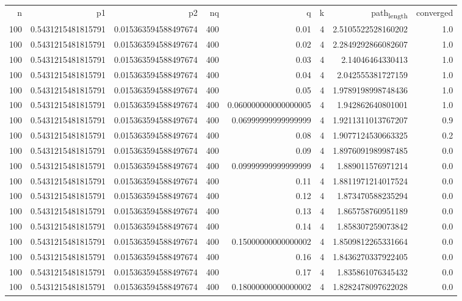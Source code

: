 \documentclass[11pt]{article}
\begin{document}
\begin{center}
\begin{tabular}{rrrrrrrr}
n & p1 & p2 & nq & q & k & path\textsubscript{length} & converged\\
100 & 0.5431215481815791 & 0.015363594588497674 & 400 & 0.01 & 4 & 2.5105522528160202 & 1.0\\
100 & 0.5431215481815791 & 0.015363594588497674 & 400 & 0.02 & 4 & 2.2849292866082607 & 1.0\\
100 & 0.5431215481815791 & 0.015363594588497674 & 400 & 0.03 & 4 & 2.14046464330413 & 1.0\\
100 & 0.5431215481815791 & 0.015363594588497674 & 400 & 0.04 & 4 & 2.042555381727159 & 1.0\\
100 & 0.5431215481815791 & 0.015363594588497674 & 400 & 0.05 & 4 & 1.9789198998748436 & 1.0\\
100 & 0.5431215481815791 & 0.015363594588497674 & 400 & 0.060000000000000005 & 4 & 1.942862640801001 & 1.0\\
100 & 0.5431215481815791 & 0.015363594588497674 & 400 & 0.06999999999999999 & 4 & 1.9211311013767207 & 0.9\\
100 & 0.5431215481815791 & 0.015363594588497674 & 400 & 0.08 & 4 & 1.9077124530663325 & 0.2\\
100 & 0.5431215481815791 & 0.015363594588497674 & 400 & 0.09 & 4 & 1.8976091989987485 & 0.0\\
100 & 0.5431215481815791 & 0.015363594588497674 & 400 & 0.09999999999999999 & 4 & 1.889011576971214 & 0.0\\
100 & 0.5431215481815791 & 0.015363594588497674 & 400 & 0.11 & 4 & 1.8811971214017524 & 0.0\\
100 & 0.5431215481815791 & 0.015363594588497674 & 400 & 0.12 & 4 & 1.873470588235294 & 0.0\\
100 & 0.5431215481815791 & 0.015363594588497674 & 400 & 0.13 & 4 & 1.865758760951189 & 0.0\\
100 & 0.5431215481815791 & 0.015363594588497674 & 400 & 0.14 & 4 & 1.858307259073842 & 0.0\\
100 & 0.5431215481815791 & 0.015363594588497674 & 400 & 0.15000000000000002 & 4 & 1.8509812265331664 & 0.0\\
100 & 0.5431215481815791 & 0.015363594588497674 & 400 & 0.16 & 4 & 1.8436270337922405 & 0.0\\
100 & 0.5431215481815791 & 0.015363594588497674 & 400 & 0.17 & 4 & 1.835861076345432 & 0.0\\
100 & 0.5431215481815791 & 0.015363594588497674 & 400 & 0.18000000000000002 & 4 & 1.8282478097622028 & 0.0\\

\end{tabular}
\end{center}
\end{document}
